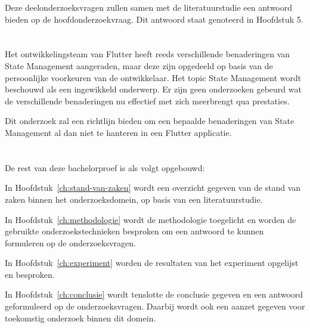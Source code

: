 Deze deelonderzoeksvragen zullen samen met de literatuurstudie een antwoord bieden op de hoofdonderzoekvraag. Dit antwoord staat genoteerd in Hoofdstuk 5.


\section{}
\label{sec:onderzoeksdoelstelling}

Het ontwikkelingsteam van Flutter heeft reeds verschillende benaderingen van State Management aangeraden, maar deze zijn opgedeeld op basis van de persoonlijke voorkeuren van de ontwikkelaar. Het topic State Management wordt beschouwd als een ingewikkeld onderwerp. Er zijn geen onderzoeken gebeurd wat de verschillende benaderingen nu effectief met zich meerbrengt qua prestaties.

Dit onderzoek zal een richtlijn bieden om een bepaalde benaderingen van State Management al dan niet te hanteren in een Flutter applicatie. 

\section{}
\label{sec:opzet-bachelorproef}


De rest van deze bachelorproef is als volgt opgebouwd:

In Hoofdstuk~\ref{ch:stand-van-zaken} wordt een overzicht gegeven van de stand van zaken binnen het onderzoeksdomein, op basis van een literatuurstudie.

In Hoofdstuk~\ref{ch:methodologie} wordt de methodologie toegelicht en worden de gebruikte onderzoekstechnieken besproken om een antwoord te kunnen formuleren op de onderzoeksvragen.

In Hoofdstuk~\ref{ch:experiment} worden de resultaten van het experiment opgelijst en besproken.

In Hoofdstuk~\ref{ch:conclusie} wordt tenslotte de conclusie gegeven en een antwoord geformuleerd op de onderzoeksvragen. Daarbij wordt ook een aanzet gegeven voor toekomstig onderzoek binnen dit domein.
